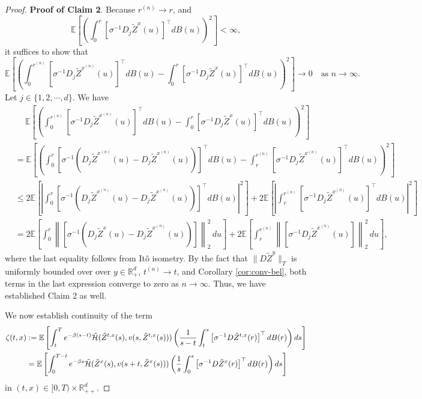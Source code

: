 \documentclass[11pt]{article}
\theoremstyle{definition}
\theoremstyle{plain}
\newcommand{\cH}{{\cal H}}
\begin{document}
\begin{appendices}
\begin{proof}
\textbf{Proof of Claim 2}. Because \( r^{(n)} \to r \), and  
\[
\mathbb{E} \left[ \left(\int_0^r \left[\sigma^{-1} D_j \tilde{Z}^x(u)\right]^{\top} dB(u) \right)^2 \right] < \infty,
\]
it suffices to show that  
\[
\mathbb{E} \left[ \left(\int_0^{r^{(n)}} \left[\sigma^{-1} D_j \tilde{Z}^{x^{(n)}}(u)\right]^{\top} dB(u) 
- \int_0^r \left[\sigma^{-1} D_j \tilde{Z}^x(u)\right]^{\top} dB(u) \right)^2 \right] \to 0 
\quad \text{as } n \to \infty.
\]
Let $j \in \{1, 2, \cdots, d\}$. We have  
\begin{align*}
&\quad \ \mathbb{E} \left[ \left( \int_0^{r^{(n)}} \left[\sigma^{-1} D_j \tilde{Z}^{x^{(n)}}(u)\right]^{\top} dB(u) - \int_0^r \left[\sigma^{-1} D_j \tilde{Z}^x(u)\right]^{\top} dB(u) \right)^2 \right] \\
& = \mathbb{E} \left[ \left( \int_0^r \left[\sigma^{-1} \left(D_j \tilde{Z}^{x^{(n)}}(u) - D_j \tilde{Z}^{x^{(n)}}(u)\right)\right]^{\top} dB(u) 
- \int_r^{r^{(n)}} \left[\sigma^{-1} D_j \tilde{Z}^{x^{(n)}}(u)\right]^{\top} dB(u) \right)^2 \right] \\
& \leq 2 \mathbb{E} \left[ \left| \int_0^r \left[\sigma^{-1} \left(D_j \tilde{Z}^{x^{(n)}}(u) - D_j \tilde{Z}^{x^{(n)}}(u)\right)\right]^{\top} dB(u) \right|^2 \right] + 
 2 \mathbb{E} \left[ \left| \int_r^{r^{(n)}} \left[\sigma^{-1} D_j \tilde{Z}^{x^{(n)}}(u)\right]^{\top} dB(u) \right|^2 \right]\\
& = 2 \mathbb{E} \left[ \int_0^r \left\|\left[\sigma^{-1} (D_j \tilde{Z}^x(u) - D_j \tilde{Z}^{x^{(n)}}(u))\right] \right\|_2^2 \, du \right] 
+ 2 \mathbb{E} \left[ \int_r^{r^{(n)}} \left\| \left[\sigma^{-1} D_j \tilde{Z}^{x^{(n)}}(u)\right] \right\|_2^2 \, du \right],
\end{align*}
where the last equality follows from Itô isometry. By the fact that \( \| D \tilde{Z}^{y} \|_T \) is uniformly bounded 
over over \( y \in \mathbb{R}_+^d \), $t^{(n)} \to t$, and Corollary \ref{cor:conv-bel}, 
both terms in the last expression converge to  zero as \( n \to \infty \). Thus, we have established Claim 2 as well. 

We now establish continuity of the term  
\begin{align*}
\zeta(t,x) & := \mathbb{E} \left[ \int_t^T e^{-\beta(s - t)} \tilde \cH (\tilde{Z}^{t,x}(s), v(s, \tilde{Z}^{t,x}(s))) 
\left( \frac{1}{s - t} \int_t^s \left[\sigma^{-1} D \tilde{Z}^{t,x}(r)\right]^{\top} dB(r) \right) ds \right]\\
& = \mathbb{E} \left[ \int_0^{T - t} e^{-\beta s} \tilde \cH(\tilde{Z}^x(s), v(s + t, \tilde{Z}^x(s))) 
\left( \frac{1}{s} \int_0^s \left[\sigma^{-1} D \tilde{Z}^x(r)\right]^{\top} dB(r) \right) ds \right]
\end{align*}
in \( (t,x) \in [0,T) \times \mathbb{R}_{++}^d \).


\end{proof}
\end{appendices}
\end{document}
